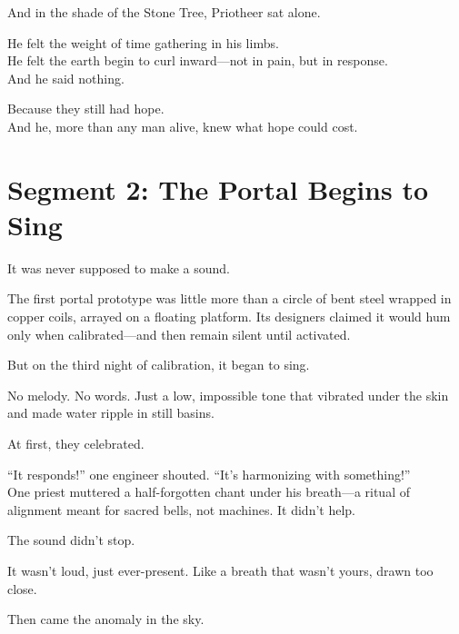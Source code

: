 \documentclass[9pt]{article}
\begin{document}
\vspace{0.5em}
And in the shade of the Stone Tree, Priotheer sat alone.

\vspace{0.5em}
He felt the weight of time gathering in his limbs.\\
He felt the earth begin to curl inward---not in pain, but in response.\\
And he said nothing.

\vspace{0.5em}
Because they still had hope.\\
And he, more than any man alive, knew what hope could cost.


\newpage


\section*{Segment 2: The Portal Begins to Sing}

It was never supposed to make a sound.

\vspace{0.5em}
The first portal prototype was little more than a circle of bent steel wrapped in copper coils, arrayed on a floating platform. Its designers claimed it would hum only when calibrated---and then remain silent until activated.

\vspace{0.5em}
But on the third night of calibration, it began to sing.

\vspace{0.5em}
No melody. No words. Just a low, impossible tone that vibrated under the skin and made water ripple in still basins.

\vspace{0.5em}
At first, they celebrated.

\vspace{0.5em}
``It responds!'' one engineer shouted. ``It’s harmonizing with something!''\\
One priest muttered a half-forgotten chant under his breath---a ritual of alignment meant for sacred bells, not machines. It didn’t help.

\vspace{0.5em}
The sound didn’t stop.

\vspace{0.5em}
It wasn’t loud, just ever-present. Like a breath that wasn’t yours, drawn too close.

\vspace{0.5em}
Then came the anomaly in the sky.
\end{document}
